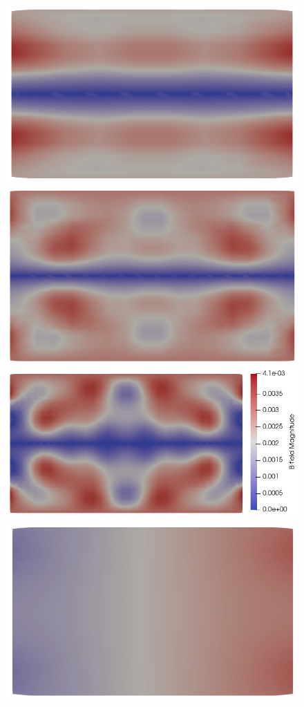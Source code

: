 \documentclass{report}
\begin{document}
\begin{figure}
    \includegraphics[scale=0.27]{clip_B_T-1_lambda-1e-1_8-2-2.png}
    \includegraphics[scale=0.27]{clip_B_T-1_lambda-1e-1_16-3-3.png}
    \includegraphics[scale=0.27]{clip_B_T-1_lambda-1e-1_32-3-4.png}
    \includegraphics[scale=0.27]{clip_ne_T-1_lambda-1e-1_8-2-2.png}

\end{figure}
\end{document}
